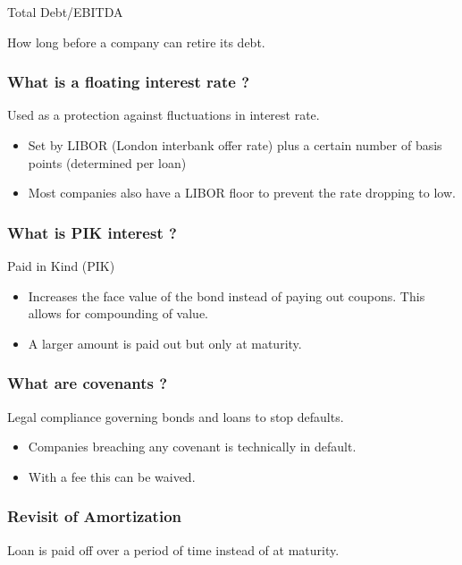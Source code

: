 \documentclass[11pt]{scrartcl} %
\begin{document}
Total Debt/EBITDA

How long before a company can retire its debt.

\subsubsection{What is a floating interest rate ?}

Used as a protection against fluctuations in interest rate.

\begin{itemize}
	\item Set by LIBOR (London interbank offer rate) plus a certain number of basis points (determined per loan)
	\item Most companies also have a LIBOR floor to prevent the rate dropping to low.
\end{itemize}

\subsubsection{What is PIK interest ?}

Paid in Kind (PIK)

\begin{itemize}
	\item Increases the face value of the bond instead of paying out coupons. This allows for compounding of value.
	\item A larger amount is paid out but only at maturity.
\end{itemize}

\subsubsection{What are covenants ?}

Legal compliance governing bonds and loans to stop defaults.

\begin{itemize}
	\item Companies breaching any covenant is technically in default.
	\item With a fee this can be waived.
\end{itemize}

\subsubsection{Revisit of Amortization}

Loan is paid off over a period of time instead of at maturity.
\end{document}
